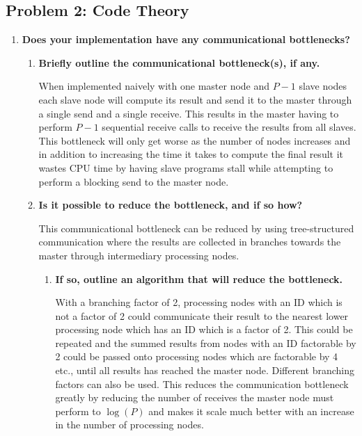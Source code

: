 \subsection*{Problem 2: Code Theory}

\begin{enumerate}

\item \textbf{Does your implementation have any communicational bottlenecks?}

\begin{enumerate}

\item \textbf{Briefly outline the communicational bottleneck(s), if any.}

When implemented naively with one master node and $P-1$ slave nodes each slave node will compute its result and send it to the master through a single send and a single receive. This results in the master having to perform $P-1$ sequential receive calls to receive the results from all slaves. This bottleneck will only get worse as the number of nodes increases and in addition to increasing the time it takes to compute the final result it wastes CPU time by having slave programs stall while attempting to perform a blocking send to the master node.

\item \textbf{Is it possible to reduce the bottleneck, and if so how?}

This communicational bottleneck can be reduced by using tree-structured communication where the results are collected in branches towards the master through intermediary processing nodes. 

\begin{enumerate}

\item \textbf{If so, outline an algorithm that will reduce the bottleneck.}

With a branching factor of 2, processing nodes with an ID which is not a factor of 2 could communicate their result to the nearest lower processing node which has an ID which is a factor of 2. This could be repeated and the summed results from nodes with an ID factorable by 2 could be passed onto processing nodes which are factorable by 4 etc., until all results has reached the master node. Different branching factors can also be used. This reduces the communication bottleneck greatly by reducing the number of receives the master node must perform to $\log(P)$ and makes it scale much better with an increase in the number of processing nodes.


\end{enumerate}
\end{enumerate}
\end{enumerate}
